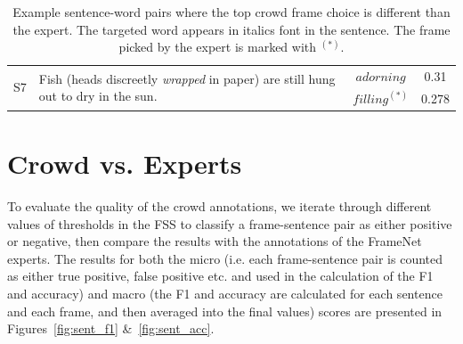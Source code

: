 \begin{table}[tb!]
{\begin{tabular}{cp{8cm}cc}
\multirow{2}{*}{S7} & \multirow{2}{8cm}{Fish (heads discreetly \textit{wrapped} in paper) are still hung out to dry in the sun.} & $adorning$ & 0.31 \\  %
& & $filling^{(*)}$ & 0.278 \\ %
\bottomrule
\end{tabular}
}

\caption{Example sentence-word pairs where the top crowd frame choice is different than the expert. The targeted word appears in italics font in the sentence. The frame picked by the expert is marked with $^{(*)}$.}
\label{tab:disagr}
\end{table}

\section{Crowd vs. Experts}
\label{sec:frame-crowd-exp}

To evaluate the quality of the crowd annotations, we iterate through different values of thresholds in the FSS to classify a frame-sentence pair as either positive or negative, then compare the results with the annotations of the FrameNet experts. The results for both the micro (i.e. each frame-sentence pair is counted as either true positive, false positive etc. and used in the calculation of the F1 and accuracy) and macro (the F1 and accuracy are calculated for each sentence and each frame, and then averaged into the final values) scores are presented in Figures~\ref{fig:sent_f1} \&~\ref{fig:sent_acc}.

